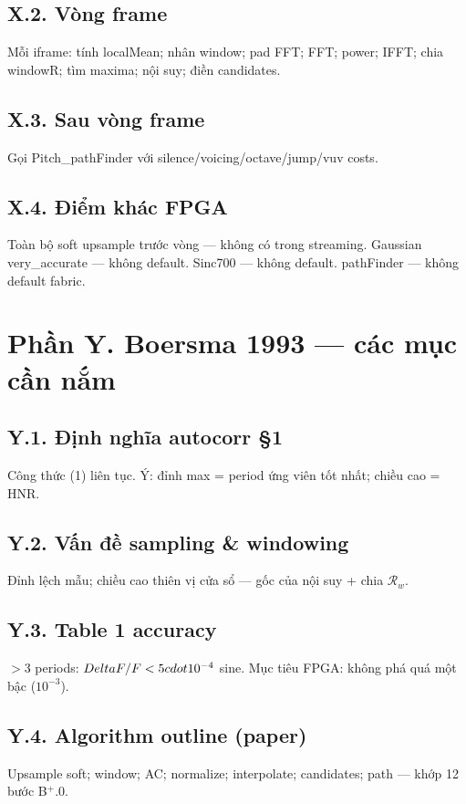 \subsection*{X.2. Vòng frame}
Mỗi iframe: tính localMean; nhân window; pad FFT; FFT; power; IFFT; chia windowR; tìm maxima; nội suy; điền candidates.
\subsection*{X.3. Sau vòng frame}
Gọi Pitch\_pathFinder với silence/voicing/octave/jump/vuv costs.
\subsection*{X.4. Điểm khác FPGA}
Toàn bộ soft upsample trước vòng --- không có trong streaming.
Gaussian very\_accurate --- không default.
Sinc700 --- không default.
pathFinder --- không default fabric.

\newpage\section*{Phần Y. Boersma 1993 --- các mục cần nắm}
\subsection*{Y.1. Định nghĩa autocorr §1}
Công thức (1) liên tục. Ý: đỉnh max = period ứng viên tốt nhất; chiều cao = HNR.
\subsection*{Y.2. Vấn đề sampling \& windowing}
Đỉnh lệch mẫu; chiều cao thiên vị cửa sổ --- gốc của nội suy + chia $\mathcal{R}_w$.
\subsection*{Y.3. Table 1 accuracy}
$>3$ periods: $\\Delta F/F < 5\\cdot10^{-4}$ sine. Mục tiêu FPGA: không phá quá một bậc ($10^{-3}$).
\subsection*{Y.4. Algorithm outline (paper)}
Upsample soft; window; AC; normalize; interpolate; candidates; path --- khớp 12 bước B$^+$.0.

\newpage
